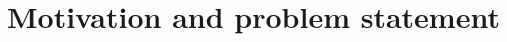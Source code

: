 \documentclass[a4paper,12pt,twoside]{memoir}
\begin{document}
\captionnamefont{\bfseries}

\frontmatter
{}





\section{Motivation and problem statement}
\end{document}
